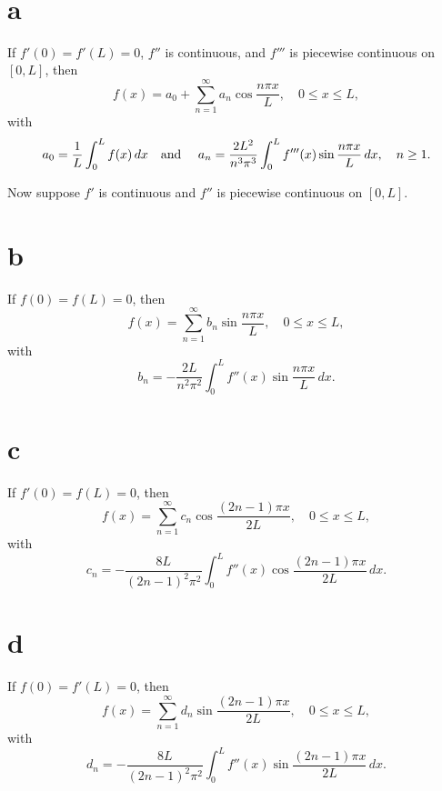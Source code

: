 \begin{theorem}
  \color{blue}
  \label{thmtype:11.3.5} \mbox{}\\

\part{a} If $f'(0)=f'(L)=0$, $f''$ is continuous, and $f'''$ is piecewise continuous on $[0,L]$,
then
  \begin{equation}
    \label{eq:11.3.3}f(x)=a_{0}+\sum_{n=1}^{\infty}a_{n}\cos\frac{n\pi x}{L}, \quad0\le x\le L,
  \end{equation}
  with
  \begin{equation}
    \label{eq:11.3.4}a_{0}=\frac{1}{L}\int_{0}^{L}f(x)\,dx\mbox{\quad and \quad}a_{n}=\frac{2L^{2}}{n^{3}\pi^{3}}\int_{0}^{L}f'''(x)\sin\frac{n\pi x}{L}\,dx, \quad n\ge1.
  \end{equation}

  Now suppose $f'$ is continuous and $f''$ is piecewise continuous on $[0,L]$.

\part{b} If $f(0)=f(L)=0$, then
  \[
    f(x)=\sum_{n=1}^{\infty}b_{n}\sin\frac{n\pi x}{L}, \quad0\le x\le L,
  \]
  with
  \begin{equation}
    \label{eq:11.3.5}b_{n}=-\frac{2L}{n^{2}\pi^{2}}\int_{0}^{L}f''(x)\sin\frac{n\pi x}{L}\,dx.
  \end{equation}

\part{c} If $f'(0)=f(L)=0$, then
  \[
    f(x)= \sum_{n=1}^{\infty}c_{n}\cos\frac{(2n-1)\pi x}{2L}, \quad0\le x\le L,
  \]
  with
  \begin{equation}
    \label{eq:11.3.6}c_{n}=-\frac{8L}{(2n-1)^{2}\pi^{2}}\int_{0}^{L}f''(x)\cos\frac{(2n-1)\pi x}{2L}\,dx.
  \end{equation}

\part{d} If $f(0)=f'(L)=0$, then
  \[
    f(x)= \sum_{n=1}^{\infty}d_{n}\sin\frac{(2n-1)\pi x}{2L}, \quad0\le x\le L,
  \]
  with
  \begin{equation}
    \label{eq:11.3.7}d_{n}=-\frac{8L}{(2n-1)^{2}\pi^{2}}\int_{0}^{L}f''(x)\sin\frac{(2n-1)\pi x}{2L}\,dx.
  \end{equation}
\end{theorem}

